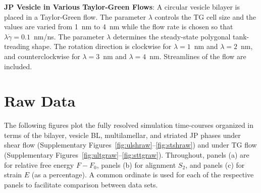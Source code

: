 
\noindent
{\label{MovieS6}\bf JP Vesicle in Various Taylor-Green Flows}: A
circular vesicle bilayer is placed in a Taylor-Green flow. The parameter
$\lambda$ controls the TG cell size and the values are varied from 1~nm
to 4~nm while the flow rate is chosen so that
$\lambda\dot\gamma=0.1$~nm/ns. The parameter $\lambda$ determines the
steady-state polygonal tank-treading shape. The rotation direction is
clockwise for $\lambda=1$~nm and $\lambda=2$~nm, and counterclockwise
for $\lambda=3$~nm and $\lambda=4$~nm. Streamlines of the flow are
included.



\section{Raw Data}
The following figures plot the fully resolved simulation time-courses
organized in terms of the bilayer, vesicle BL, multilamellar, and striated JP phases
under shear flow (Supplementary Figures~\ref{fig:ulshraw}--\ref{fig:stshraw})
and under TG flow (Supplementary Figures~\ref{fig:ultgraw}--\ref{fig:sttgraw}).
Throughout, panels (a) are for relative free energy $F - F_0$,
panels (b) for alignment $S_2$, and panels (c) for strain $E$ (as a percentage). 
A common ordinate is used for each of the respective panels to facilitate
comparison between data sets. 

